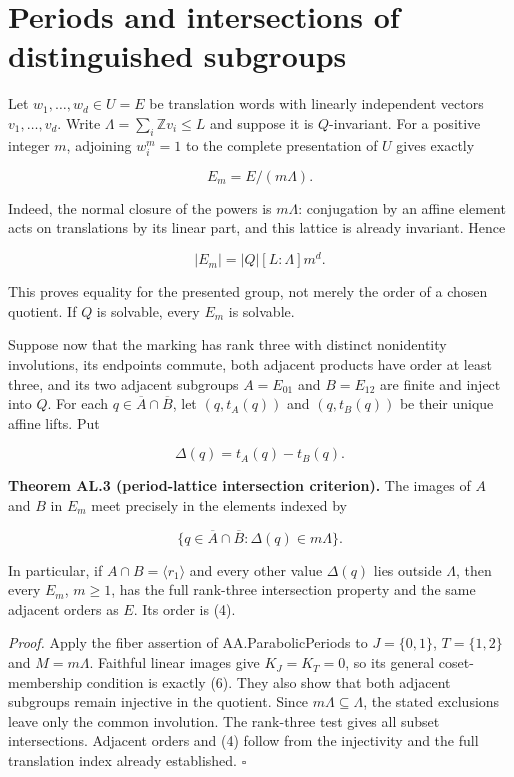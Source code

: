 \section{Periods and intersections of distinguished subgroups}\label{periods-and-intersections-of-distinguished-subgroups}

Let \(w_1,\ldots,w_d\in U=E\) be translation words with linearly independent
vectors \(v_1,\ldots,v_d\). Write
\(\Lambda=\sum_i\mathbb Z v_i\leq L\) and suppose it is \(Q\)-invariant.
For a positive integer \(m\), adjoining \(w_i^m=1\) to the complete
presentation of \(U\) gives exactly

\[ E_m=E/(m\Lambda).\tag{3}\]

Indeed, the normal closure of the powers is \(m\Lambda\): conjugation by
an affine element acts on translations by its linear part, and this
lattice is already invariant. Hence

\[ |E_m|=|Q|[L:\Lambda]m^d.\tag{4}\]

This proves equality for the presented group, not merely the order of a
chosen quotient. If \(Q\) is solvable, every \(E_m\) is solvable.

Suppose now that the marking has rank three with distinct nonidentity involutions,
its endpoints commute, both adjacent products have order at least three, and
its two adjacent subgroups \(A=E_{01}\) and \(B=E_{12}\) are finite and
inject into \(Q\). For each \(q\in\overline A\cap\overline B\), let
\((q,t_A(q))\) and \((q,t_B(q))\) be their unique affine lifts. Put

\[ \Delta(q)=t_A(q)-t_B(q).\tag{5} \]

\textbf{Theorem AL.3 (period-lattice intersection criterion).} The images of \(A\)
and \(B\) in \(E_m\) meet precisely in the elements indexed by

\[ \{q\in\overline A\cap\overline B:\Delta(q)\in m\Lambda\}.\tag{6}\]

In particular, if \(A\cap B=\langle r_1\rangle\) and every other value
\(\Delta(q)\) lies outside \(\Lambda\), then every \(E_m\), \(m\geq1\), has
the full rank-three intersection property and the same adjacent orders
as \(E\). Its order is (4).

\emph{Proof.} Apply the fiber assertion of AA.ParabolicPeriods to
$J=\{0,1\}$, $T=\{1,2\}$ and $M=m\Lambda$. Faithful linear images give
$K_J=K_T=0$, so its general coset-membership condition is exactly (6).
They also show that both adjacent subgroups remain injective in the
quotient. Since $m\Lambda\subseteq\Lambda$, the stated exclusions leave
only the common involution. The rank-three test gives all subset
intersections. Adjacent orders and (4) follow from the injectivity and
the full translation index already established. \(\square\)

